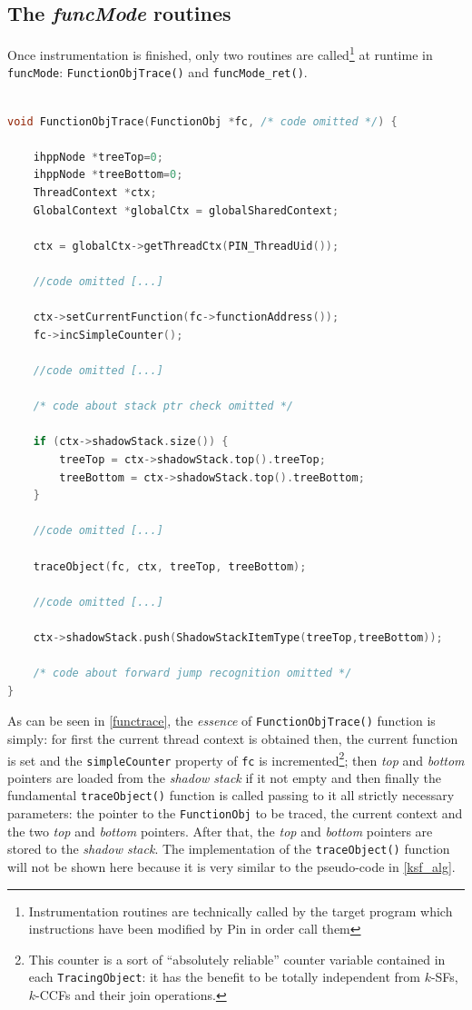 \documentclass[a4paper,10pt]{report}
\begin{document}
\subsection{The \emph{funcMode} routines}

Once instrumentation is finished, only two routines are 
called\footnote{Instrumentation routines are technically called by the target program
which instructions have been modified by Pin in order call them}
at runtime in \verb|funcMode|: \verb|FunctionObjTrace()| and \verb|funcMode_ret()|.

\begin{lstlisting}[language=C++, 
	caption={a fragment of \texttt{FunctionObjTrace()} routine}, 
	label=functrace, frame=leftline]

void FunctionObjTrace(FunctionObj *fc, /* code omitted */) {

	ihppNode *treeTop=0;
	ihppNode *treeBottom=0;	
	ThreadContext *ctx;
	GlobalContext *globalCtx = globalSharedContext;

	ctx = globalCtx->getThreadCtx(PIN_ThreadUid());

	//code omitted [...]

	ctx->setCurrentFunction(fc->functionAddress());
	fc->incSimpleCounter();

	//code omitted [...]

	/* code about stack ptr check omitted */

	if (ctx->shadowStack.size()) {
		treeTop = ctx->shadowStack.top().treeTop; 
		treeBottom = ctx->shadowStack.top().treeBottom;
	} 

	//code omitted [...]

	traceObject(fc, ctx, treeTop, treeBottom);

	//code omitted [...]

	ctx->shadowStack.push(ShadowStackItemType(treeTop,treeBottom));

	/* code about forward jump recognition omitted */
}

\end{lstlisting}

\noindent
As can be seen in \cref{functrace}, the \emph{essence} of \verb|FunctionObjTrace()|
function is simply: for first the current thread context is obtained then, 
the current function is set and the \verb|simpleCounter| property of \verb|fc|
is incremented\footnote{This counter is 
a sort of ``absolutely reliable'' counter variable contained in each \texttt{TracingObject}:
it has the benefit to be totally independent from $k$-SFs, $k$-CCFs and their join
operations.}; then \emph{top} and \emph{bottom} pointers are loaded from the 
\emph{shadow stack} if it not empty and then finally the fundamental \verb|traceObject()|
function is called passing to it all strictly necessary parameters: 
the pointer to the \verb|FunctionObj| to be traced, the current context and the
two \emph{top} and \emph{bottom} pointers. After that, the \emph{top} and \emph{bottom} pointers are stored to the \emph{shadow stack}. 
The implementation of the \verb|traceObject()| function will not be shown here
because it is very similar to the pseudo-code in \cref{ksf_alg}.
\end{document}
